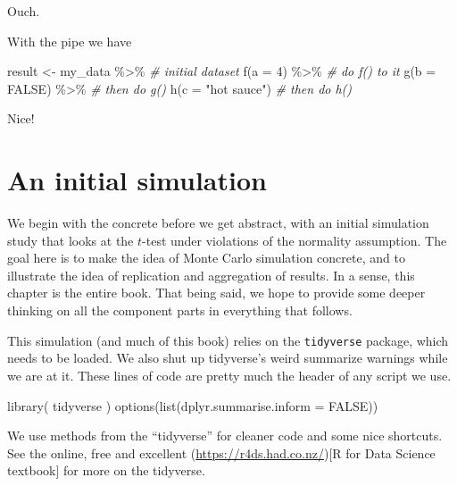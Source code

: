 \documentclass[
]{book}
\newenvironment{Shaded}{\begin{snugshade}}{\end{snugshade}}
\newcommand{\AttributeTok}[1]{\textcolor[rgb]{0.77,0.63,0.00}{#1}}
\newcommand{\CommentTok}[1]{\textcolor[rgb]{0.56,0.35,0.01}{\textit{#1}}}
\newcommand{\ConstantTok}[1]{\textcolor[rgb]{0.00,0.00,0.00}{#1}}
\newcommand{\DecValTok}[1]{\textcolor[rgb]{0.00,0.00,0.81}{#1}}
\newcommand{\FunctionTok}[1]{\textcolor[rgb]{0.00,0.00,0.00}{#1}}
\newcommand{\NormalTok}[1]{#1}
\newcommand{\OtherTok}[1]{\textcolor[rgb]{0.56,0.35,0.01}{#1}}
\newcommand{\SpecialCharTok}[1]{\textcolor[rgb]{0.00,0.00,0.00}{#1}}
\newcommand{\StringTok}[1]{\textcolor[rgb]{0.31,0.60,0.02}{#1}}
\begin{document}
Ouch.

With the pipe we have

\begin{Shaded}
\begin{Highlighting}[]
\NormalTok{result }\OtherTok{\textless{}{-}} 
\NormalTok{  my\_data }\SpecialCharTok{\%\textgreater{}\%}        \CommentTok{\# initial dataset}
  \FunctionTok{f}\NormalTok{(}\AttributeTok{a =} \DecValTok{4}\NormalTok{) }\SpecialCharTok{\%\textgreater{}\%}       \CommentTok{\# do f() to it}
  \FunctionTok{g}\NormalTok{(}\AttributeTok{b =} \ConstantTok{FALSE}\NormalTok{) }\SpecialCharTok{\%\textgreater{}\%}   \CommentTok{\# then do g()}
  \FunctionTok{h}\NormalTok{(}\AttributeTok{c =} \StringTok{"hot sauce"}\NormalTok{) }\CommentTok{\# then do h()}
\end{Highlighting}
\end{Shaded}

Nice!

\hypertarget{an-initial-simulation}{%
\chapter{An initial simulation}\label{an-initial-simulation}}

We begin with the concrete before we get abstract, with an initial simulation study that looks at the \(t\)-test under violations
of the normality assumption.
The goal here is to make the idea of Monte Carlo simulation concrete, and to illustrate the idea of replication
and aggregation of results.
In a sense, this chapter is the entire book.
That being said, we hope to provide some deeper thinking on all the component parts in everything that follows.

This simulation (and much of this book) relies on the \texttt{tidyverse} package, which needs to be loaded.
We also shut up tidyverse's weird summarize warnings while we are at it.
These lines of code are pretty much the header of any script we use.

\begin{Shaded}
\begin{Highlighting}[]
\FunctionTok{library}\NormalTok{( tidyverse )}
\FunctionTok{options}\NormalTok{(}\FunctionTok{list}\NormalTok{(}\AttributeTok{dplyr.summarise.inform =} \ConstantTok{FALSE}\NormalTok{))}
\end{Highlighting}
\end{Shaded}

We use methods from the ``tidyverse'' for cleaner code and some nice shortcuts.
See the online, free and excellent (\url{https://r4ds.had.co.nz/}){[}R for Data Science textbook{]} for more on the tidyverse.
\end{document}
